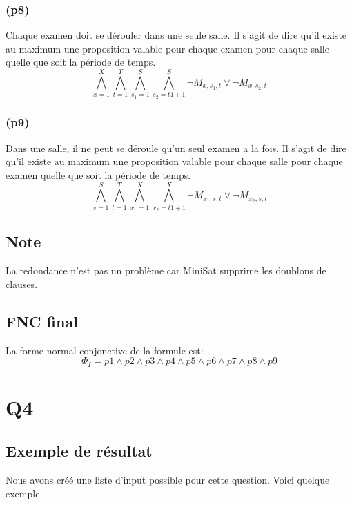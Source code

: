 \documentclass[a4paper,11pt]{article}
\begin{document}
\subsubsection{(p8)}
Chaque examen doit se dérouler dans une seule salle.
Il s'agit de dire qu'il existe au maximum une proposition valable pour chaque examen pour chaque salle quelle que soit la période de temps.
\begin{displaymath}
\bigwedge\limits_{x=1}^{X}\bigwedge\limits_{t=1}^{T}\bigwedge\limits_{s_{1}=1}^{S}\bigwedge\limits_{s_{2}=t1+1}^{S} \neg M_{x, s_{1}, t} \vee \neg M_{x, s_{2}, t}
\end{displaymath}

\subsubsection{(p9)}
Dans une salle, il ne peut se déroule qu'un seul examen a la fois.
Il s'agit de dire qu'il existe au maximum une proposition valable pour chaque salle pour chaque examen quelle que soit la période de temps.
\begin{displaymath}
\bigwedge\limits_{s=1}^{S}\bigwedge\limits_{t=1}^{T}\bigwedge\limits_{x_{1}=1}^{X}\bigwedge\limits_{x_{2}=t1+1}^{X} \neg M_{x_{1}, s, t} \vee \neg M_{x_{2}, s, t}
\end{displaymath}

\subsection{Note}
La redondance n'est pas un problème car MiniSat supprime les doublons de clauses.

\subsection{FNC final}
La forme normal conjonctive de la formule est:
\begin{displaymath}
\Phi_{I} = p1 \wedge p2 \wedge p3 \wedge p4 \wedge p5 \wedge p6 \wedge p7 \wedge p8 \wedge p9
\end{displaymath}

\section{Q4}

\subsection{Exemple de résultat}
Nous avons créé une liste d'input possible pour cette question. Voici quelque exemple
\end{document}
